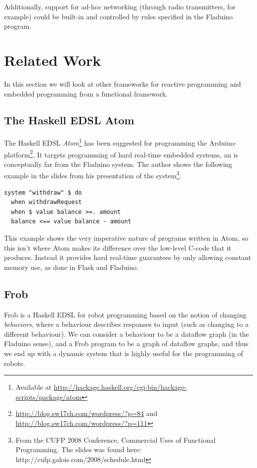 \documentclass[a4paper, oneside, final]{memoir}
\begin{document}
Additionally, support for ad-hoc networking (through radio
transmitters, for example) could be built-in and controlled by rules
specified in the Fladuino program.

\chapter{Related Work}
In this section we will look at other frameworks for reactive
programming and embedded programming from a functional framework.

\section{The Haskell EDSL Atom}
The Haskell EDSL \textit{Atom}\footnote{Available at
  \url{http://hackage.haskell.org/cgi-bin/hackage-scripts/package/atom}}
has been suggested for programming the
Arduino-platform\footnote{\url{http://blog.sw17ch.com/wordpress/?p=84}
  and \url{http://blog.sw17ch.com/wordpress/?p=111}}.  It targets
programming of hard real-time embedded systems, an is conceptually far
from the Fladuino system. The author shows the following example in
the slides from his presentation of the system\footnote{From the CUFP
  2008 Conference, Commercial Uses of Functional Programming. The
  slides was found here: http://cufp.galois.com/2008/schedule.html}.

\begin{verbatim}
system "withdraw" $ do
  when withdrawRequest
  when $ value balance >=. amount
  balance <== value balance - amount
\end{verbatim}

This example shows the very imperative nature of programs written in
Atom, so this isn't where Atom makes its difference over the low-level
C-code that it produces. Instead it provides hard real-time guarantees
by only allowing constant memory use, as done in Flask and Fladuino.

\section{Frob}

Frob\cite{frob99} is a Haskell EDSL for robot programming based on the
notion of changing \textit{behaviors}, where a behaviour describes
responses to input (such as changing to a different behaviour).  We
can consider a behaviour to be a dataflow graph (in the Fladuino
sense), and a Frob program to be a graph of dataflow graphs, and thus
we end up with a dynamic system that is highly useful for the
programming of robots.
\end{document}
